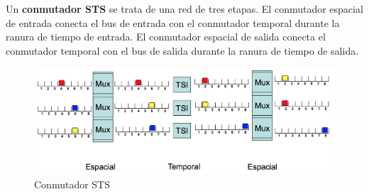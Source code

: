 \documentclass[10pt,portrait, twocolumn]{article}
\begin{document}
Un \textbf{conmutador STS} se trata de una red de tres etapas. El conmutador espacial de entrada conecta el bus de entrada con el conmutador temporal durante la ranura de tiempo de entrada. El conmutador espacial de salida conecta el conmutador temporal con el bus de salida durante la ranura de tiempo de salida.

	\begin{figure}[!ht]
 		\centering
  		 \includegraphics[scale = 0.4]{images/STS}
		\caption{Conmutador STS}
	\end{figure}

	
	
	




\end{document}

